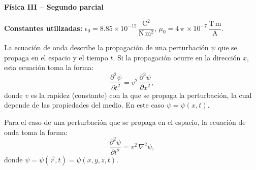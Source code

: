 \documentclass[addpoints]{exam}
\newcommand{\pddiff}[2]{\frac{\partial^2 #1}{\partial {#2}^2}}
\newcommand{\E}[1]{\times 10^{#1}}
\begin{document}
\renewcommand{\tablename}{Tabla}


\begin{tcolorbox}[colback=white,arc=0mm,colframe=black]
    \begin{center}
        \Large\textbf{Física III -- Segundo parcial}
    \end{center}
\end{tcolorbox}

\vspace{11pt}

\textbf{Constantes utilizadas:} $\epsilon_0 = 8.85 \E{-12} \, \dfrac{\text{C}^2}{\text{N} \, \text{m}^2}$, $\mu_0 = 4 \, \pi \, \E{-7} \, \dfrac{\text{T} \, \text{m}}{\text{A}}$.

\vspace{11pt}

\begin{tcolorbox}[colback=black!5!white,arc=0mm,breakable,pad at break*=1mm,colframe=black!25!white,title=\textbf{\textcolor{black}{Ecuación de ondas}}]
    La ecuación de onda describe la propagación de una perturbación $\psi$ que se propaga en el espacio y el tiempo $t$. Si la propagación ocurre en la dirección $x$, esta ecuación toma la forma:
    \begin{equation}
        \label{ec:ec_de_onda_x}
        \pddiff{\psi}{t} = v^2 \, \pddiff{\psi}{x},
    \end{equation} donde $v$ es la rapidez (constante) con la que se propaga la perturbación, la cual depende de las propiedades del medio. En este caso $\psi = \psi (x,t)$.

    \vspace{11pt}

    Para el caso de una perturbación que se propaga en el espacio, la ecuación de onda toma la forma:
    \begin{equation}
        \label{ec:ec_de_onda_3D}
        \pddiff{\psi}{t} = v^2 \, \nabla^2 \psi,
    \end{equation} donde $\psi = \psi(\vec{r},t) = \psi (x,y,z,t)$.
\end{tcolorbox}

\vspace{11pt}
\end{document}
